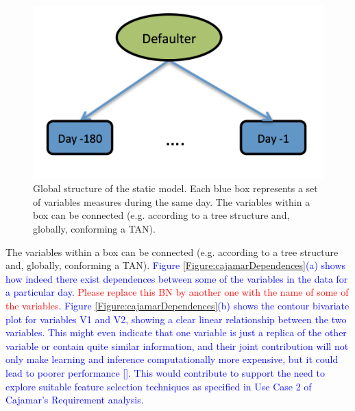 \begin{figure}
\begin{center}
\includegraphics[scale=0.45]{./figures/CajaMarModel0}
\caption{\label{Figure:CajaMarStatic}Global structure of the static model. Each blue box represents a set of variables measures during the same day.
The variables within a box can be connected (e.g. according to a tree structure and, globally, conforming a TAN).}
\label{fig:static}
\end{center}
\end{figure}

The variables within a box can be connected (e.g. according to a tree structure and, globally, conforming a TAN). \textcolor{blue}{Figure \ref{Figure:cajamarDependences}(a) shows how indeed there exist dependences between some of the variables in the data for a particular day. \textcolor{red}{Please replace this BN by another one with the name of some of the variables}. Figure \ref{Figure:cajamarDependences}(b) shows the contour bivariate plot for variables V1 and V2, showing a clear linear relationship between the two variables. This might even indicate that one variable is just a replica of the other variable or contain quite similar information, and their joint contribution will not only make learning and inference computationally more expensive, but it could lead to poorer performance []. This would contribute to support the need to explore suitable feature selection techniques as specified in Use Case 2 of Cajamar's Requirement analysis.}

